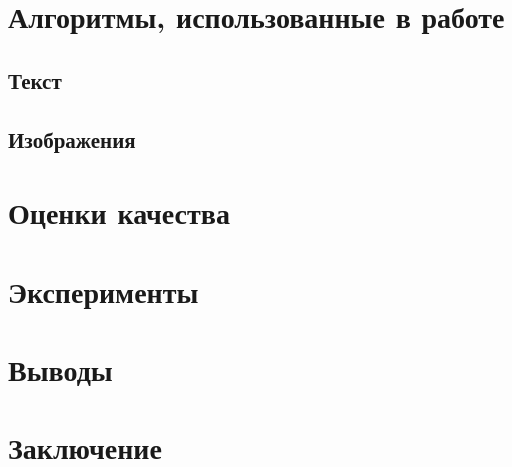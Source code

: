 \documentclass[aps,%
12pt,%
final,%
oneside,
onecolumn,%
musixtex, %
superscriptaddress,%
centertags]{article} %
\begin{document}
\section{Алгоритмы, использованные в работе}
\subsection{Текст}
\subsection{Изображения}

\section{Оценки качества}

\section{Эксперименты}

\section{Выводы}

\section{Заключение}




\end{document}
